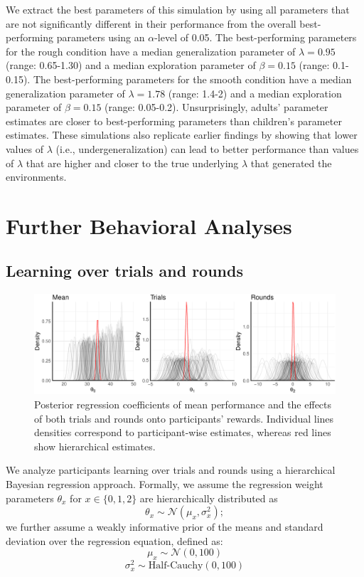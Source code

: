 We extract the best parameters of this simulation by using all parameters that are not significantly different in their performance from the overall best-performing parameters using an $\alpha$-level of 0.05. The best-performing parameters for the rough condition have a median generalization parameter of $\lambda=0.95$ (range: 0.65-1.30) and a median exploration parameter of $\beta=0.15$ (range: 0.1-0.15). The best-performing parameters for the smooth condition have a median generalization parameter of $\lambda=1.78$ (range: 1.4-2) and a median exploration parameter of $\beta=0.15$ (range: 0.05-0.2). Unsurprisingly, adults' parameter estimates are closer to best-performing parameters than children's parameter estimates. These simulations also replicate earlier findings by \cite{wu2018exploration} showing that lower values of $\lambda$ (i.e., undergeneralization) can lead to better performance than values of $\lambda$ that are higher and closer to the true underlying $\lambda$ that generated the environments.



\section*{Further Behavioral Analyses} 
\subsection*{Learning over trials and rounds} 
\begin{figure}[ht!]
\centering
\includegraphics[width=0.8\linewidth]{trialsandrounds.pdf}
\caption{Posterior regression coefficients of mean performance and the effects of both trials and rounds onto participants' rewards. Individual lines densities correspond to participant-wise estimates, whereas red lines show hierarchical estimates.} 
\label{fig:trialandrounds}
\vspace{-1mm}
\end{figure}
We analyze participants learning over trials and rounds using a hierarchical Bayesian regression approach. Formally, we assume the regression weight parameters $\theta_x$ for $x\in\{0,1,2\}$ are hierarchically distributed as
\begin{equation}
\theta_{x} \sim \mathcal{N}(\mu_x, \sigma_{x}^2); 
\end{equation}
we further assume a weakly informative prior of the means and standard deviation over the regression equation, defined as:
\begin{equation}
\mu_x \sim \mathcal{N}(0, 100) 
\label{eqn:hier_mean}
\end{equation}
\begin{equation}
\sigma_{x}^2 \sim \text{Half-Cauchy}(0, 100) 
\end{equation}

